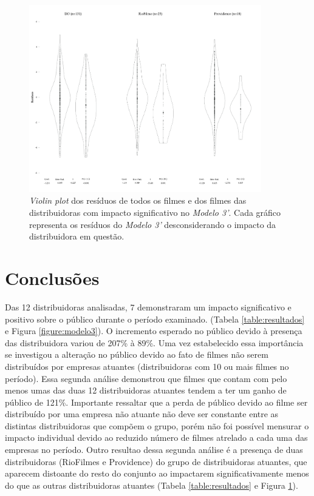 \documentclass[11pt,a4paper]{article}
\begin{document}
 

\begin{figure}[h!]
\centering
\includegraphics[width=0.9\textwidth]{figura_2.png}
 \caption{\textit{Violin plot} dos resíduos de todos os filmes e dos filmes das distribuidoras com impacto significativo no \textit{Modelo 3'}. Cada gráfico representa os resíduos do \textit{Modelo 3'} desconsiderando o impacto da distribuidora em questão.}
\label{figure:modelo3_2}
\end{figure}


\section{Conclusões}

Das 12 distribuidoras analisadas, 7 demonstraram um impacto significativo e positivo sobre o público durante o período examinado. (Tabela \ref{table:resultados} e Figura \ref{figure:modelo3}). O incremento esperado no público devido à presença das distribuidora variou de 207\% à 89\%. Uma vez estabelecido essa importância se investigou a alteração no público devido ao fato de filmes não serem distribuídos por empresas atuantes (distribuidoras com 10 ou mais filmes no período). Essa segunda análise  demonstrou que filmes que contam com pelo menos umas das duas 12 distribuidoras atuantes tendem a ter um ganho de público de 121\%. Importante ressaltar que a perda de público devido ao filme ser distribuído por uma empresa não atuante não deve ser constante entre as distintas distribuidoras que compõem o grupo, porém não foi possível mensurar o impacto individual devido ao reduzido número de filmes atrelado a cada uma das empresas no período. Outro resultao dessa segunda análise é a presença de duas distribuidoras (RioFilmes e Providence) do grupo de distribuidoras atuantes, que aparecem distoante do resto do conjunto ao impactarem significativamente menos do que as outras distribuidoras atuantes (Tabela \ref{table:resultados} e Figura \ref{figure:modelo3_2}).  
\end{document}
